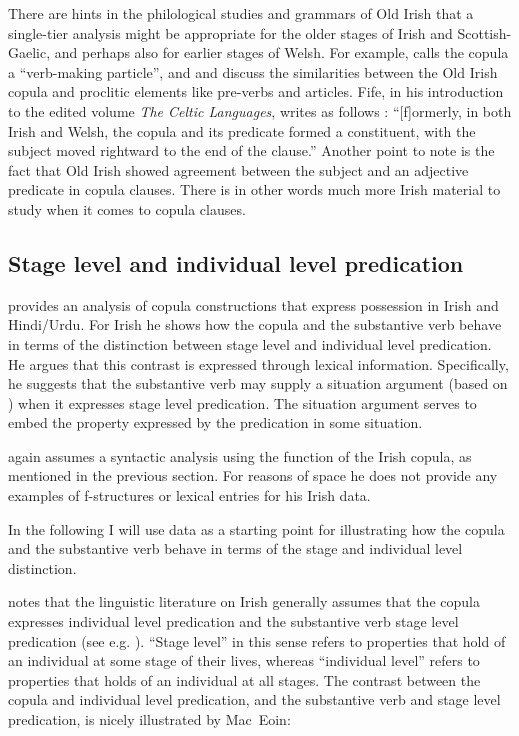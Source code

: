 \documentclass[output=paper,colorlinks,citecolor=brown]{langscibook}
\begin{document}
There are hints in the philological studies and grammars of Old Irish that a single-tier analysis might be appropriate for the older stages of Irish and Scottish-Gaelic, and perhaps also for earlier stages of Welsh. For example, \citet[271]{Ahlqvist1971-72} calls the copula a ``verb-making particle'', and \citet[24--25]{Thurneysen1998} and \citet[211]{McCone1996} discuss the similarities between the Old Irish copula and proclitic elements like pre-verbs and articles. Fife, in his introduction to the edited volume \emph{The Celtic Languages}, writes as follows \citep[20]{Fife2002}: ``[f]ormerly, in both Irish and Welsh, the copula and its predicate formed a constituent, with the subject moved rightward to the end of the clause.'' Another point to note is the fact that Old Irish showed agreement between the subject and an adjective predicate in copula clauses. There is in other words much more Irish material to study when it comes to copula clauses.

\subsection{Stage level and individual level predication}
\label{sec:Celtic:5.3}

\citet{Sulger2011} provides an analysis of copula constructions that express possession in Irish and Hindi/Urdu. For Irish he shows how the copula and the substantive verb behave in terms of the distinction between stage level and individual level predication. He argues that this contrast is expressed through lexical information. Specifically, he suggests that the substantive verb may supply a situation argument (based on \citealt{Kratzer1995}) when it expresses stage level predication. The situation argument serves to embed the property expressed by the predication in some situation.

\citet[19--20]{Sulger2011} again assumes a syntactic analysis using the \PREDLINK function of the Irish copula, as mentioned in the previous section. For reasons of space he does not provide any examples of f-structures or lexical entries for his Irish data.

In the following I will use  data as a starting point for illustrating how the copula and the substantive verb behave in terms of the stage and individual level distinction.

\citet[12]{Sulger2011} notes that the linguistic literature on Irish generally assumes that the copula expresses individual level predication and the substantive verb stage level predication (see e.g. \citealt[40]{Doherty1996}). ``Stage level'' in this sense refers to properties that hold of an individual at some stage of their lives, whereas ``individual level'' refers to properties that holds of an individual at all stages. The contrast between the copula and individual level predication, and the substantive verb and stage level predication, is nicely illustrated by Mac~Eoin:
\end{document}
